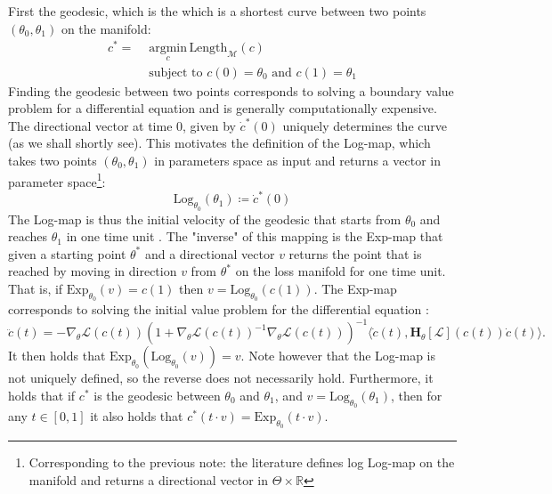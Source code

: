 First the geodesic, which is the which is a shortest curve between two points $(\theta_0, \theta_1)$ on the manifold: 
\begin{align}
    c^\ast=& \,\, \underset{c}{\text{argmin}} \, \text{Length}_\mathcal M (c) \\
    & \,\,\text{subject to } c(0) = \theta_0 \text{ and } c(1) = \theta_1 \label{eq:geodesic}
\end{align}
Finding the geodesic between two points corresponds to solving a boundary value problem for a differential equation and is generally computationally expensive. 
The directional vector at time 0, given by $\dot{c}^\ast(0)$ uniquely determines the curve (as we shall shortly see). This motivates the definition of the Log-map, which takes two points $(\theta_0, \theta_1)$ in parameters space as input and returns a vector in parameter space\footnote{Corresponding to the previous note: the literature defines log Log-map on the manifold and returns a directional vector in $\Theta \times \mathbb R$}:
\begin{equation*}
    \text{Log}_{\theta_0}(\theta_1) \coloneqq \dot{c}^\ast(0)
\end{equation*}
The Log-map is thus the initial velocity of the geodesic that starts from $\theta_0$ and reaches $\theta_1$ in one time unit \cite{fröhlich2021bayesianquadratureriemanniandata}.
The "inverse" of this mapping is the Exp-map that given a starting point $\theta^\ast$ and a directional vector $v$ returns the point that is reached by moving in direction $v$ from $\theta^\ast$ on the loss manifold for one time unit. That is, if 
$\text{Exp}_{\theta_0}(v) = c(1)$ then $v = \text{Log}_{\theta_0}(c(1))$.
The Exp-map corresponds to solving the initial value problem for the differential equation \cite{bergamin2023riemannian}:
\begin{equation}
    \ddot{c}(t)=-\nabla_{\theta}\mathcal{L}(c(t))\left(1+\nabla_{\theta}\mathcal{L}(c(t))^{-1}\nabla_{\theta}\mathcal{L}(c(t))\right)^{-1}\langle\dot{c}(t),\mathbf{H}_{\theta}[\mathcal{L}](c(t))\dot{c}(t)\rangle.
\end{equation}
It then holds that $\text{Exp}_{\theta_0}(\text{Log}_{\theta_0}(v)) = v.$
Note however that the Log-map is not uniquely defined, so the reverse does not necessarily hold. Furthermore, it holds that if $c^\ast$ is the geodesic between $\theta_0$ and $\theta_1$, and $v=\text{Log}_{\theta_0}(\theta_1)$, then for any $t \in [0,1]$ it also holds that $c^\ast(t\cdot v) = \text{Exp}_{\theta_0}(t\cdot v)$.

